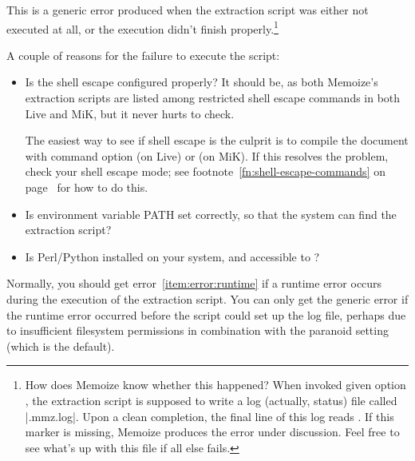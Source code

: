 \documentclass[a4paper,11pt]{article}
\begin{document}
\begin{enumerate}
  This is a generic error produced when the extraction script was either not
  executed at all, or the execution didn't finish properly.\footnote{How does
    Memoize know whether this happened?  When invoked given option
    , the extraction script is supposed
    to write a log (actually, status) file called
    \mbox{}|.mmz.log|.  Upon a clean completion, the final line
    of this log reads .  If this marker is missing, Memoize
    produces the error under discussion.  Feel free to see what's up with this
    file if all else fails.}

  A couple of reasons for the failure to execute the script:
  \begin{itemize}
  \item Is the shell escape configured properly?  It should be, as both
    Memoize's extraction scripts are listed among restricted shell escape
    commands in both Live and MiK, but it never hurts
    to check.

    The easiest way to see if shell escape is the culprit is to compile the
    document with command option  (on Live)
    or  (on MiK).  If this resolves the
    problem, check your shell escape mode; see
    footnote~\ref{fn:shell-escape-commands} on
    page~\pageref{fn:shell-escape-commands} for how to do this.
  \item Is environment variable PATH set correctly, so that the system can find
    the extraction script?
  \item Is Perl\slash Python installed on your system, and accessible to
    ?
  \end{itemize}

  Normally, you should get error~\ref{item:error:runtime} if a runtime error
  occurs during the execution of the extraction script.  You can only get the
  generic error if the runtime error occurred before the script could set up
  the log file, perhaps due to insufficient filesystem permissions in
  combination with the paranoid  setting (which is the
  default).


\end{enumerate}
\end{document}
